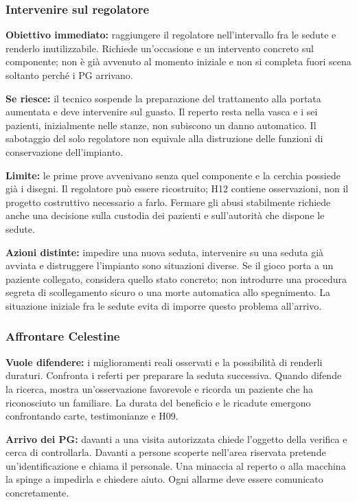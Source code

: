 \documentclass[11pt,a4paper]{article}
\begin{document}
\subsubsection{Intervenire sul regolatore}
\textbf{Obiettivo immediato:} raggiungere il regolatore nell'intervallo fra le sedute e renderlo inutilizzabile. Richiede un'occasione e un intervento concreto sul componente; non è già avvenuto al momento iniziale e non si completa fuori scena soltanto perché i PG arrivano.

\textbf{Se riesce:} il tecnico sospende la preparazione del trattamento alla portata aumentata e deve intervenire sul guasto. Il reperto resta nella vasca e i sei pazienti, inizialmente nelle stanze, non subiscono un danno automatico. Il sabotaggio del solo regolatore non equivale alla distruzione delle funzioni di conservazione dell'impianto.

\textbf{Limite:} le prime prove avvenivano senza quel componente e la cerchia possiede già i disegni. Il regolatore può essere ricostruito; H12 contiene osservazioni, non il progetto costruttivo necessario a farlo. Fermare gli abusi stabilmente richiede anche una decisione sulla custodia dei pazienti e sull'autorità che dispone le sedute.

\textbf{Azioni distinte:} impedire una nuova seduta, intervenire su una seduta già avviata e distruggere l'impianto sono situazioni diverse. Se il gioco porta a un paziente collegato, considera quello stato concreto; non introdurre una procedura segreta di scollegamento sicuro o una morte automatica allo spegnimento. La situazione iniziale fra le sedute evita di imporre questo problema all'arrivo.

\subsubsection{Affrontare Celestine}
\textbf{Vuole difendere:} i miglioramenti reali osservati e la possibilità di renderli duraturi. Confronta i referti per preparare la seduta successiva. Quando difende la ricerca, mostra un'osservazione favorevole e ricorda un paziente che ha riconosciuto un familiare. La durata del beneficio e le ricadute emergono confrontando carte, testimonianze e H09.

\textbf{Arrivo dei PG:} davanti a una visita autorizzata chiede l'oggetto della verifica e cerca di controllarla. Davanti a persone scoperte nell'area riservata pretende un'identificazione e chiama il personale. Una minaccia al reperto o alla macchina la spinge a impedirla e chiedere aiuto. Ogni allarme deve essere comunicato concretamente.
\end{document}
